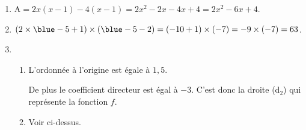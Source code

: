 
\medskip

\begin{enumerate}
	\item %
	
$\text{A} = 2x(x - 1) - 4 (x - 1) = 2x^2 - 2x  - 4x + 4 = 2x^2 - 6x + 4$.
	\item %
$(2\times {\blue - 5}+ 1) \times ({\blue - 5}-2) = (- 10 + 1) \times (- 7) = - 9 \times (- 7) = 63$.	
	\item %
		\begin{enumerate}
			\item %
L'ordonnée à l'origine est égale à $1,5$.

De plus le coefficient directeur est égal à $- 3$. C'est donc la droite (d$_2$) qui représente la fonction $f$.	
			\item %
			Voir ci-dessus.
		\end{enumerate}
	\end{enumerate}


\vspace{5mm}

